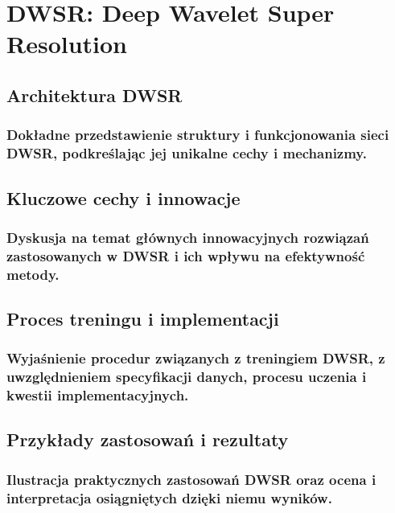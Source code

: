 \chapter{DWSR: Deep Wavelet Super Resolution}
\section{Architektura DWSR}
\subsection{Dokładne przedstawienie struktury i funkcjonowania sieci DWSR, podkreślając jej unikalne cechy i mechanizmy.}
\section{Kluczowe cechy i innowacje}
\subsection{Dyskusja na temat głównych innowacyjnych rozwiązań zastosowanych w DWSR i ich wpływu na efektywność metody.}
\section{Proces treningu i implementacji}
\subsection{Wyjaśnienie procedur związanych z treningiem DWSR, z uwzględnieniem specyfikacji danych, procesu uczenia i kwestii implementacyjnych.}
\section{Przykłady zastosowań i rezultaty}
\subsection{Ilustracja praktycznych zastosowań DWSR oraz ocena i interpretacja osiągniętych dzięki niemu wyników.}
